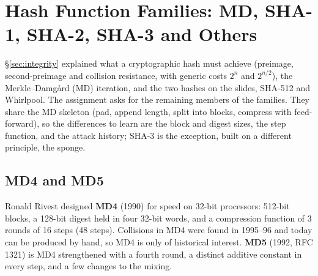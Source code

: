 \section{Hash Function Families: MD, SHA-1, SHA-2, SHA-3 and Others}\label{sec:hashfamily}

\S\ref{sec:integrity} explained what a cryptographic hash must achieve (preimage, second-preimage and collision resistance, with generic costs $2^n$ and $2^{n/2}$), the Merkle--Damg\aa rd (MD) iteration, and the two hashes on the slides, SHA-512 and Whirlpool. The assignment asks for the remaining members of the families. They share the MD skeleton (pad, append length, split into blocks, compress with feed-forward), so the differences to learn are the block and digest sizes, the step function, and the attack history; SHA-3 is the exception, built on a different principle, the sponge.

\subsection{MD4 and MD5 \new}

Ronald Rivest designed \textbf{MD4} (1990) for speed on 32-bit processors: 512-bit blocks, a 128-bit digest held in four 32-bit words, and a compression function of 3 rounds of 16 steps (48 steps). Collisions in MD4 were found in 1995--96 and today can be produced by hand, so MD4 is only of historical interest. \textbf{MD5} (1992, RFC 1321) is MD4 strengthened with a fourth round, a distinct additive constant in every step, and a few changes to the mixing.

